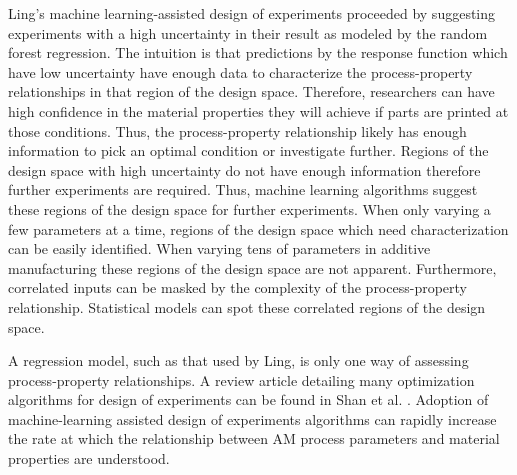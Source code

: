 Ling's machine learning-assisted design of experiments proceeded by suggesting experiments with a high uncertainty in their result as modeled by the random forest regression. The intuition is that predictions by the response function which have low uncertainty have enough data to characterize the process-property relationships in that region of the design space. Therefore, researchers can have high confidence in the material properties they will achieve if parts are printed at those conditions. Thus, the process-property relationship likely has enough information to pick an optimal condition or investigate further. Regions of the design space with high uncertainty do not have enough information therefore further experiments are required. Thus, machine learning algorithms suggest these regions of the design space for further experiments. When only varying a few parameters at a time, regions of the design space which need characterization can be easily identified. When varying tens of parameters in additive manufacturing these regions of the design space are not apparent. Furthermore, correlated inputs can be masked by the complexity of the process-property relationship. Statistical models can spot these correlated regions of the design space.

A regression model, such as that used by Ling, is only one way of assessing process-property relationships. A review article detailing many optimization algorithms for design of experiments can be found in Shan et al. \cite{Shan2010}. Adoption of machine-learning assisted design of experiments algorithms can rapidly increase the rate at which the relationship between AM process parameters and material properties are understood. 
